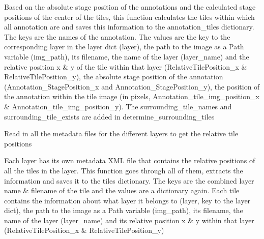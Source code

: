 \documentclass[letterpaper,10pt,english]{sphinxmanual}
\begin{document}
\begin{fulllineitems}
\begin{fulllineitems}
Based on the absolute stage position of the annotations and the calculated stage positions of the center of the
tiles, this function calculates the tiles within which all annotation are and saves this information to the
annotation\_tiles dictionary. The keys are the names of the annotation. The values are the key to the
corresponding layer in the layer dict (layer), the path to the image as a Path variable (img\_path), its
filename, the name of the layer (layer\_name) and the relative position x \& y of the tile within that layer
(RelativeTilePosition\_x \& RelativeTilePosition\_y), the absolute stage position of the annotation
(Annotation\_StagePosition\_x and Annotation\_StagePosition\_y), the position of the annotation within the tile
image (in pixels, Annotation\_tile\_img\_position\_x \& Annotation\_tile\_img\_position\_y).
The surrounding\_tile\_names and surrounding\_tile\_exists are added in determine\_surrounding\_tiles

\end{fulllineitems}


\begin{fulllineitems}
\label{\detokenize{index:sites_of_interest_parser.MapsXmlParser.get_relative_tile_locations}}
Read in all the metadata files for the different layers to get the relative tile positions

Each layer has its own metadata XML file that contains the relative positions of all the tiles in the layer.
This function goes through all of them, extracts the information and saves it to the tiles dictionary.
The keys are the combined layer name \& filename of the tile and the values are a dictionary again. Each tile
contains the information about what layer it belongs to (layer, key to the layer dict), the path to the image as
a Path variable (img\_path), its filename, the name of the layer (layer\_name) and its relative position x \& y
within that layer (RelativeTilePosition\_x \& RelativeTilePosition\_y)

\end{fulllineitems}



\end{fulllineitems}
\end{document}
